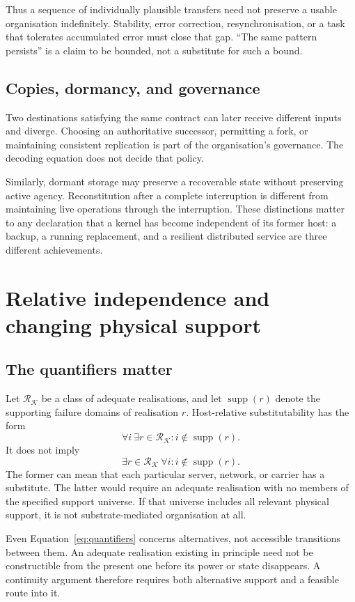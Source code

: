 \documentclass[11pt,a4paper]{article}
\theoremstyle{definition}
\theoremstyle{remark}
\newcommand{\calK}{\mathcal{K}}
\DeclareMathOperator{\supp}{supp}
\begin{document}
Thus a sequence of individually plausible transfers need not preserve a usable organisation indefinitely. Stability, error correction, resynchronisation, or a task that tolerates accumulated error must close that gap. ``The same pattern persists'' is a claim to be bounded, not a substitute for such a bound.

\subsection{Copies, dormancy, and governance}
Two destinations satisfying the same contract can later receive different inputs and diverge. Choosing an authoritative successor, permitting a fork, or maintaining consistent replication is part of the organisation's governance. The decoding equation does not decide that policy.

Similarly, dormant storage may preserve a recoverable state without preserving active agency. Reconstitution after a complete interruption is different from maintaining live operations through the interruption. These distinctions matter to any declaration that a kernel has become independent of its former host: a backup, a running replacement, and a resilient distributed service are three different achievements.

\section{Relative independence and changing physical support}\label{sec:independence}
\subsection{The quantifiers matter}
Let $\mathscr R_{\calK}$ be a class of adequate realisations, and let $\supp(r)$ denote the supporting failure domains of realisation $r$. Host-relative substitutability has the form
\begin{equation}\label{eq:quantifiers}
 \forall i\ \exists r\in\mathscr R_{\calK}:i\notin\supp(r).
\end{equation}
It does not imply
\[
 \exists r\in\mathscr R_{\calK}\ \forall i:i\notin\supp(r).
\]
The former can mean that each particular server, network, or carrier has a substitute. The latter would require an adequate realisation with no members of the specified support universe. If that universe includes all relevant physical support, it is not substrate-mediated organisation at all.

Even Equation~\eqref{eq:quantifiers} concerns alternatives, not accessible transitions between them. An adequate realisation existing in principle need not be constructible from the present one before its power or state disappears. A continuity argument therefore requires both alternative support and a feasible route into it.
\end{document}
